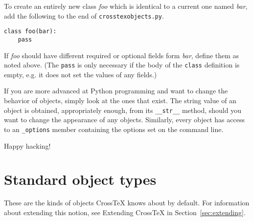 \documentclass{article}
\newcommand{\XTX}{Cross\TeX}
\begin{document}
To create an entirely new class \textit{foo} which is identical to
a current one named \textit{bar}, add the following to the end of
\texttt{crosstexobjects.py}.

\begin{small}\begin{verbatim}
class foo(bar):
    pass
\end{verbatim}\end{small}

If \textit{foo} should have different required or optional fields form
\textit{bar}, define them as noted above. (The \texttt{pass} is only
necessary if the body of the \texttt{class} definition is empty, e.g. it
does not set the values of any fields.)

If you are more advanced at Python programming and want to change
the behavior of objects, simply look at the ones that exist. The
string value of an object is obtained, appropriately enough, from its
\texttt{\_\_str\_\_} method, should you want to change the appearance of
any objects. Similarly, every object has access to an \texttt{\_options}
member containing the options set on the command line.

Happy hacking!


\appendix
\section{Standard object types\label{sec:standard}}

These are the kinds of objects \XTX{} knows about by default. For
information about extending this notion, see Extending \XTX{} in
Section~\ref{sec:extending}.
\end{document}
